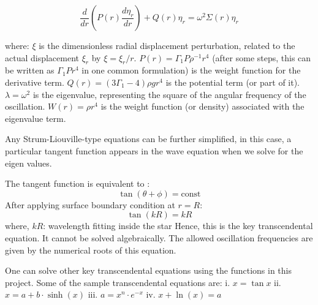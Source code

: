         $$
        \frac{d}{dr}(P(r)\frac{d\eta_r}{dr})+Q(r)\eta_r=\omega^2\Sigma(r)\eta_r
        $$

        where: \( \xi \) is the dimensionless radial displacement perturbation, related to the actual displacement \( \xi _{r} \) by \( \xi =\xi _{r}/r \). \( P(r)=\Gamma _{1}P\rho ^{-1}r^{4} \) (after some steps, this can be written as \( \Gamma _{1}Pr^{4} \) in one common formulation) is the weight function for the derivative term. \( Q(r)=(3\Gamma _{1}-4)\rho gr^{4} \) is the potential term (or part of it). \( \lambda =\omega ^{2} \) is the eigenvalue, representing the square of the angular frequency of the oscillation. \( W(r)=\rho r^{4} \) is the weight function (or density) associated with the eigenvalue term.

    Any Strum-Liouville-type equations can be further simplified, in this case, a particular tangent function appears in the wave equation when we solve for the eigen values.

    The tangent function is equivalent to :
    $$
    \tan (\theta + \phi) = \text{const}
    $$
    After applying surface boundary condition at \( r = R \):
    $$
    \tan (kR) = kR
    $$
    where, \( kR \): wavelength fitting inside the star
    Hence, this is the key transcendental equation.
    It cannot be solved algebraically. The allowed oscillation frequencies are given by the numerical roots of this equation.

    One can solve other key transcendental equations using the functions in this project. Some of the sample transcendental equations are:
    i. \( x = \tan x \)
    ii. \( x = a + b \cdot \sinh(x) \)
    iii. \( a = x^n \cdot e^{-x} \)
    iv. \( x + \ln(x) = a \)